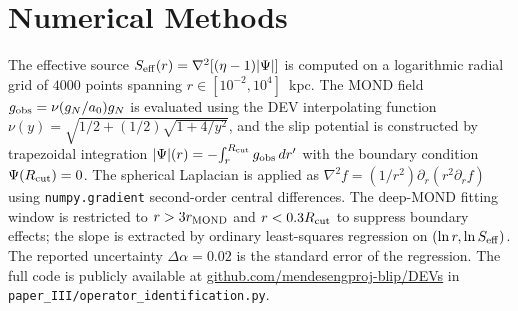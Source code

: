 \documentclass[aps,prd,twocolumn,superscriptaddress,nofootinbib]{revtex4-2}
\newcommand{\aO}{a_0}
\begin{document}
\appendix
\section{Numerical Methods}
\label{app:numerical}

The effective source $S_{\rm eff}(r) = \nabla^2[(\eta-1)|\Psi|]$
is computed on a logarithmic radial grid of $4000$ points
spanning $r \in [10^{-2},10^4]$~kpc. The MOND field
$g_{\rm obs} = \nu(g_N/\aO)g_N$ is evaluated using the
DEV interpolating function
$\nu(y) = \sqrt{1/2 + (1/2)\sqrt{1+4/y^2}}$, and the slip
potential is constructed by trapezoidal integration
$|\Psi|(r) = -\!\int_r^{R_{\rm cut}} g_{\rm obs}\,dr'$ with
the boundary condition $\Psi(R_{\rm cut})=0$. The
spherical Laplacian is applied as
$\nabla^2 f = (1/r^2)\partial_r(r^2\partial_r f)$ using
\texttt{numpy.gradient} second-order central differences.
The deep-MOND fitting window is restricted to
$r > 3 r_{\rm MOND}$ and $r < 0.3 R_{\rm cut}$ to suppress
boundary effects; the slope is extracted by ordinary
least-squares regression on $(\ln r,\ln S_{\rm eff})$.
The reported uncertainty $\Delta\alpha = 0.02$ is the
standard error of the regression. The full code is
publicly available at
\url{github.com/mendesengproj-blip/DEVs} in
\texttt{paper\_III/operator\_identification.py}.


\end{document}
